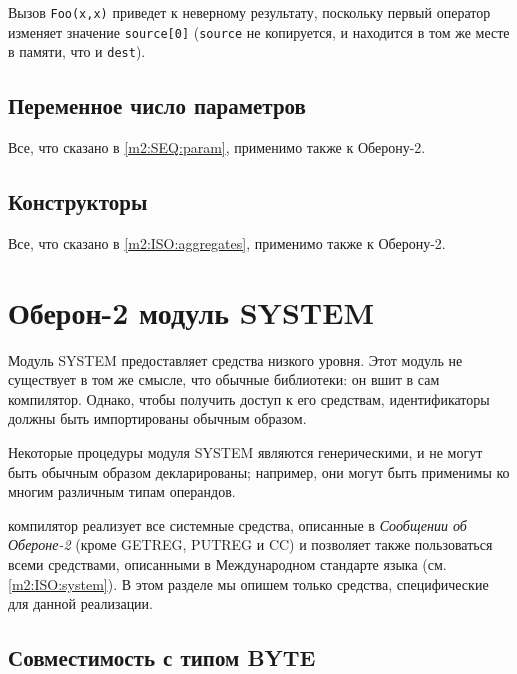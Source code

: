 Вызов \verb|Foo(x,x)| приведет к неверному результату, поскольку
первый оператор изменяет значение
\verb|source[0]| (\verb|source| не копируется, и находится в том же месте
в памяти, что и \verb|dest|).

\subsection{Переменное число параметров}

\oextonly

Все, что сказано в \ref{m2:SEQ:param}, применимо также к
Оберону-2.

\subsection{Конструкторы}

\oextonly

Все, что сказано в \ref{m2:ISO:aggregates}, применимо также к Оберону-2.

\section{Оберон-2 модуль SYSTEM}
\label{o2:system}

Модуль SYSTEM предоставляет средства низкого уровня. 
Этот модуль не существует в том же смысле, что обычные библиотеки:
он вшит в сам компилятор. Однако, чтобы получить доступ к его
средствам, идентификаторы должны быть импортированы обычным образом.

Некоторые процедуры модуля SYSTEM являются генерическими, и не могут
быть обычным образом декларированы; например, они могут быть применимы 
ко многим различным типам операндов.

\xds{} \ot{} компилятор реализует все системные средства, описанные в
{\em Сообщении об Обероне-2} (кроме GETREG, PUTREG и CC) и       %
позволяет также пользоваться всеми средствами, описанными в
Международном стандарте языка
\mt{} (см. \ref{m2:ISO:system}). 
В этом разделе мы опишем только средства, 
специфические для данной реализации.

\subsection{Совместимость с типом BYTE}


